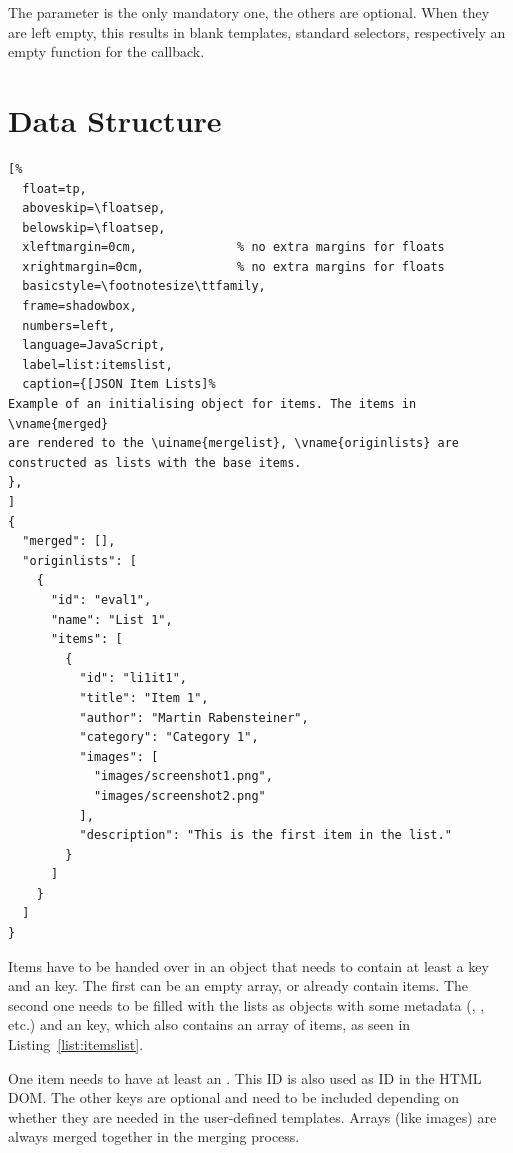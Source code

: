 The parameter  is the only mandatory one, the others are
optional. When they are left empty, this results in blank templates,
standard selectors, respectively an empty function for the callback.






\section{Data Structure}
\label{sec:libu-datastructure}

\begin{samepage}
\begin{lstlisting}[%
  float=tp,
  aboveskip=\floatsep,
  belowskip=\floatsep,
  xleftmargin=0cm,              % no extra margins for floats
  xrightmargin=0cm,             % no extra margins for floats
  basicstyle=\footnotesize\ttfamily,
  frame=shadowbox,
  numbers=left,
  language=JavaScript,
  label=list:itemslist,
  caption={[JSON Item Lists]%
Example of an initialising object for items. The items in \vname{merged}
are rendered to the \uiname{mergelist}, \vname{originlists} are
constructed as lists with the base items.
},
]
{
  "merged": [],
  "originlists": [
    {
      "id": "eval1",
      "name": "List 1",
      "items": [
        {
          "id": "li1it1",
          "title": "Item 1",
          "author": "Martin Rabensteiner",
          "category": "Category 1",
          "images": [
            "images/screenshot1.png",
            "images/screenshot2.png"
          ],
          "description": "This is the first item in the list."
        }
      ]
    }
  ]
}

\end{lstlisting}
\end{samepage}



Items have to be handed over in an object that needs to contain at least
a  key and an  key. The first can be an
empty array, or already contain items. The second one needs to be filled
with the lists as objects with some metadata (, ,
etc.) and an  key, which also contains an array of items,
as seen in Listing~\ref{list:itemslist}.

One item needs to have at least an . This ID is also used as
ID in the HTML DOM. The other keys are optional and need to be included
depending on whether they are needed in the user-defined templates.
Arrays (like images) are always merged together in the merging process.

